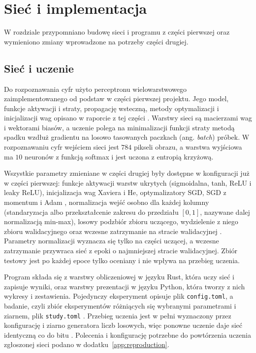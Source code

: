 \section{Sieć i implementacja}
\label{sec:implementation}

W rozdziale przypomniano budowę sieci i programu z części pierwszej oraz wymieniono zmiany wprowadzone na potrzeby części drugiej.

\subsection{Sieć i uczenie}
\label{sec:implementation-network}

Do rozpoznawania cyfr użyto perceptronu wielowarstwowego zaimplementowanego od podstaw w części pierwszej projektu. Jego model, funkcje aktywacji i straty, propagację wsteczną, metody optymalizacji i inicjalizacji wag opisano w raporcie z tej części \cite[rozdz.~3]{gracikowski2026}. Warstwy sieci są macierzami wag i wektorami biasów, a uczenie polega na minimalizacji funkcji straty metodą spadku wzdłuż gradientu na losowo tasowanych paczkach (ang. \textit{batch}) próbek. W rozpoznawaniu cyfr wejściem sieci jest $784$ pikseli obrazu, a warstwa wyjściowa ma $10$ neuronów z funkcją softmax i jest uczona z entropią krzyżową.

Wszystkie parametry zmieniane w części drugiej były dostępne w konfiguracji już w części pierwszej: funkcje aktywacji warstw ukrytych (sigmoidalna, tanh, ReLU i leaky ReLU), inicjalizacja wag Xaviera i He, optymalizatory SGD, SGD z momentum i Adam \cite[rozdz.~3.2, 3.5, 3.6]{gracikowski2026}, normalizacja wejść osobno dla każdej kolumny (standaryzacja albo przekształcenie zakresu do przedziału $[0, 1]$, nazywane dalej normalizacją min-max), losowy podzbiór zbioru uczącego, wydzielenie z niego zbioru walidacyjnego oraz wczesne zatrzymanie na stracie walidacyjnej \cite[rozdz.~4.3, 4.4]{gracikowski2026}. Parametry normalizacji wyznacza się tylko na części uczącej, a wczesne zatrzymanie przywraca sieć z epoki o najmniejszej stracie walidacyjnej. Zbiór testowy jest po każdej epoce tylko oceniany i nie wpływa na przebieg uczenia.

Program składa się z warstwy obliczeniowej w języku Rust, która uczy sieć i zapisuje wyniki, oraz warstwy prezentacji w języku Python, która tworzy z nich wykresy i zestawienia. Pojedynczy eksperyment opisuje plik \texttt{config.toml}, a badanie, czyli zbiór eksperymentów różniących się wybranymi parametrami i ziarnem, plik \texttt{study.toml} \cite[rozdz.~4.1, 4.7]{gracikowski2026}. Przebieg uczenia jest w pełni wyznaczony przez konfigurację i ziarno generatora liczb losowych, więc ponowne uczenie daje sieć identyczną co do bitu \cite[rozdz.~4.5]{gracikowski2026}. Polecenia i konfigurację potrzebne do powtórzenia uczenia zgłoszonej sieci podano w dodatku~\ref{app:reproduction}.

